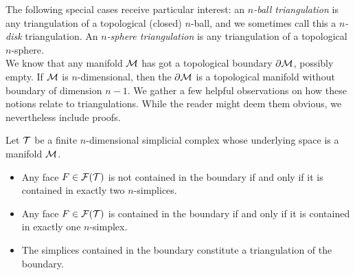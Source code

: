 \documentclass[10pt,letterpaper]{article}
\begin{document}
The following special cases receive particular interest:
an \textit{$n$-ball triangulation} is any triangulation of a topological (closed) $n$-ball,
and we sometimes call this a \textit{$n$-disk} triangulation.
An \textit{$n$-sphere triangulation} is any triangulation of a topological $n$-sphere. 
\\


We know that any manifold ${\mathcal M}$ has got a topological boundary $\partial{\mathcal M}$, possibly empty. 
If ${\mathcal M}$ is $n$-dimensional, then the $\partial{\mathcal M}$ is a topological manifold without boundary of dimension $n-1$. 
We gather a few helpful observations on how these notions relate to triangulations.
While the reader might deem them obvious, we nevertheless include proofs. 

\begin{lemma}\label{lemma:boundarysimplices}
    Let ${\mathcal T}$ be a finite $n$-dimensional simplicial complex whose underlying space is a manifold ${\mathcal M}$. 
    \begin{itemize}
        \item Any face $F \in {\mathcal F}({\mathcal T})$ is not contained in the boundary if and only if it is contained in exactly two $n$-simplices.
        \item Any face $F \in {\mathcal F}({\mathcal T})$ is contained in the boundary if and only if it is contained in exactly one $n$-simplex.
        \item The simplices contained in the boundary constitute a triangulation of the boundary.
    \end{itemize}
\end{lemma}
\end{document}
